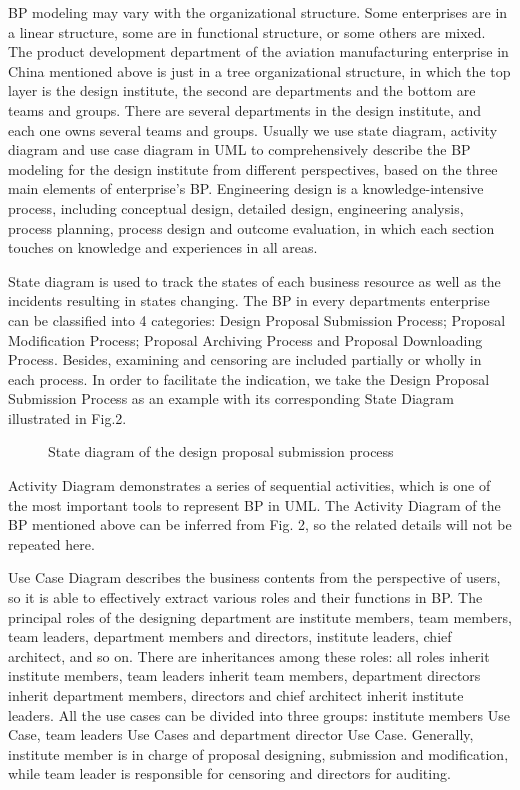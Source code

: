 \documentclass{elsarticle}
\begin{document}
\textrm{BP modeling may vary with the organizational structure. Some
enterprises are in a linear structure, some are in functional
structure, or some others are mixed. The product development department
of the aviation manufacturing enterprise in China mentioned above is
just in a tree organizational structure, in which the top layer is the
design institute, the second are departments and the bottom are teams and
groups. There are several departments in the design institute, and each
one owns several teams and groups. Usually we use state diagram,
activity diagram and use case diagram in UML to comprehensively
describe the BP modeling for the design institute from different
perspectives, based on the three main elements of
enterprise's BP. Engineering design is a
knowledge-intensive process, including conceptual design, detailed
design, engineering analysis, process planning, process design and
outcome evaluation, in which each section touches on knowledge and
experiences in all areas\cite{chen2005developing}.}


\textrm{State diagram is used to track the states of each business
resource as well as the incidents resulting in states changing. The BP
in every  departments
enterprise can be classified into 4 categories: Design Proposal
Submission Process;}
\textrm{Proposal Modification Process; Proposal Archiving Process and
Proposal Downloading Process. Besides, examining and censoring are
included partially or wholly in each process. In order to facilitate
the indication, we take the Design Proposal Submission Process as an
example with its corresponding State Diagram illustrated in Fig.2.}

  \begin{figure}[ht]
    \centering
    \scalebox{0.75}{\texttt{[image: 02]}}
    \caption{ State diagram of the design proposal submission process}
  \end{figure}


\textrm{Activity Diagram demonstrates a series of sequential activities,
which is one of the most important tools to represent BP in UML. The
Activity Diagram of the BP mentioned above can be inferred from Fig. 2,
so the related details will not be repeated here.}


\textrm{Use Case Diagram describes the business contents from the
perspective of users, so it is able to effectively extract various
roles and their functions in BP. The principal roles of the designing
department are institute members, team members, team leaders,
department members and directors, institute leaders, chief architect,
and so on. There are inheritances among these roles: all }\textrm{roles
inherit institute members, team leaders inherit team members,
department directors inherit department members, directors and chief
architect inherit institute leaders. All the use cases can be divided
into three groups: institute members Use Case, team leaders Use Cases
and department director Use Case. Generally, institute member is in
charge of proposal designing, submission and modification, while team
leader is responsible for censoring and directors for auditing.}
\end{document}
